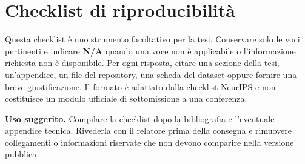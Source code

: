 
\chapter{Checklist di riproducibilit\`a}\label{app:reproducibility-checklist}

\begin{keypoint}
Questa checklist \`e uno strumento facoltativo per la tesi. Conservare solo le
voci pertinenti e indicare \textbf{N/A} quando una voce non \`e applicabile o
l'informazione richiesta non \`e disponibile. Per ogni risposta, citare una
sezione della tesi, un'appendice, un file del repository, una scheda del dataset
oppure fornire una breve giustificazione. Il formato \`e adattato dalla checklist
NeurIPS e non costituisce un modulo ufficiale di sottomissione a una conferenza.
\end{keypoint}

\noindent\textbf{Uso suggerito.}
Compilare la checklist dopo la bibliografia e l'eventuale appendice tecnica.
Rivederla con il relatore prima della consegna e rimuovere collegamenti o
informazioni riservate che non devono comparire nella versione pubblica.

